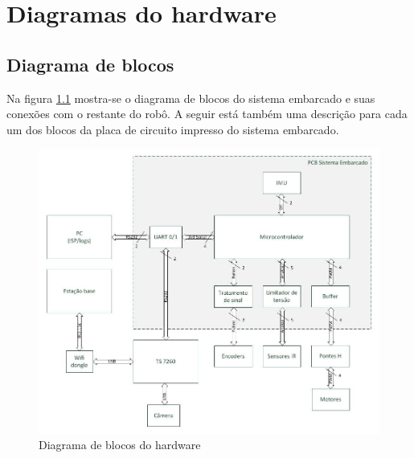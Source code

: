 
\chapter{Diagramas do hardware}

\section{Diagrama de blocos}

Na figura \ref{fig:diagrama_blocos_hardware} mostra-se o diagrama de blocos do sistema embarcado e suas conexões com o restante do robô. A seguir está também uma descrição para cada um dos blocos da placa de circuito impresso do sistema embarcado.

\begin{figure}[htpb!]
  \centering
  \includegraphics[width=\textwidth]{./figuras/diagrama_blocos_hardware.jpg}
  \caption{Diagrama de blocos do hardware}
  \label{fig:diagrama_blocos_hardware}
\end{figure}


